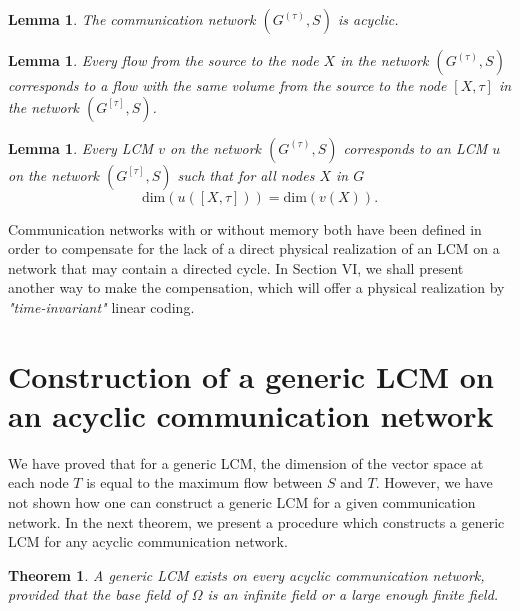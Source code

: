 \documentclass[journal]{IEEEtran}
\newtheorem{theo}[prop]{Theorem}
\newtheorem{lemm}[prop]{Lemma}
\begin{document}
\begin{lemm}
	The communication network $(G^{(\tau)},S)$ is acyclic.
\end{lemm}


\begin{lemm}
	Every flow from the source to the node $X$ in the network $(G^{(\tau)},S)$ corresponds to a flow with the same volume from the source to the node $[X,\tau]$ in the network $(G^{[\tau]},S)$.
\end{lemm}


\begin{lemm}
	Every LCM $v$ on the network $(G^{(\tau)},S)$ corresponds to an LCM $u$ on the network $(G^{[\tau]},S)$ such that for all nodes $X$ in $G$
	$$
	\text{dim}(u([X,\tau]))=\text{dim}(v(X)).
	$$
\end{lemm}


\par
Communication networks with or without memory both have been defined in order to compensate for the lack of a direct physical realization of an LCM on a network that may contain a directed cycle. In Section VI, we shall present another way to make the compensation, which will offer a physical realization by \emph{"time-invariant"} linear coding.

\section{Construction of a generic LCM on an acyclic communication network}\label{sec: construction}
\par
We have proved that for a generic LCM, the dimension of the vector space at each node $T$ is equal to the maximum flow between $S$ and $T$. However, we have not shown how one can construct a generic LCM for a given communication network. In the next theorem, we present a procedure which constructs a generic LCM for any acyclic communication network.
\begin{theo}
	A generic LCM exists on every acyclic communication network, provided that the base field of $\Omega$ is an infinite field or a large enough finite field.
\end{theo}
\end{document}
